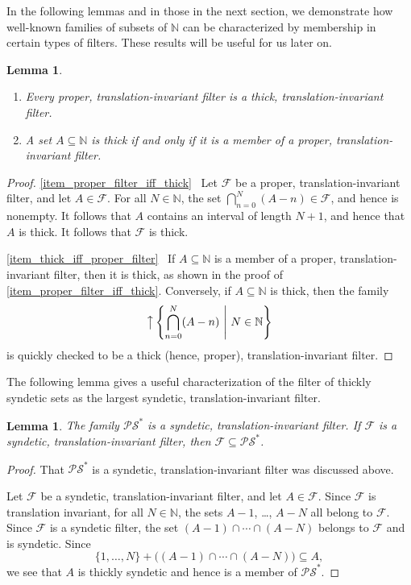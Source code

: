 \documentclass[letter,11pt]{article}
\theoremstyle{plain}
\newtheorem{lemma}[theorem]{Lemma}
\theoremstyle{definition}
\theoremstyle{plain}
\theoremstyle{plain}
\numberwithin{equation}{section}
\newcommand{\N}{\mathbb{N}}
\DeclareMathOperator{\bigupclose}{\big\uparrow}
\newcommand{\PS}{\mathcal{PS}}
\newcommand{\family}{\mathscr{F}}
\begin{document}
In the following lemmas and in those in the next section, we demonstrate how well-known families of subsets of $\N$ can be characterized by membership in certain types of filters.  These results will be useful for us later on.

\begin{lemma} \leavevmode
\label{lemma_thick_set_filter_char}
    \begin{enumerate}
        \item
        \label{item_proper_filter_iff_thick}
        Every proper, translation-invariant filter is a thick, translation-invariant filter.

        \item
        \label{item_thick_iff_proper_filter}
        A set $A \subseteq \N$ is thick if and only if it is a member of a proper, translation-invariant filter.
    \end{enumerate}
\end{lemma}

\begin{proof}
    \eqref{item_proper_filter_iff_thick} \ Let $\family$ be a proper, translation-invariant filter, and let $A \in \family$.  For all $N \in \N$, the set $\bigcap_{n=0}^N (A-n) \in \family$, and hence is nonempty.  It follows that $A$ contains an interval of length $N+1$, and hence that $A$ is thick.  It follows that $\family$ is thick.

    
    \eqref{item_thick_iff_proper_filter} \ If $A \subseteq \N$ is a member of a proper, translation-invariant filter, then it is thick, as shown in the proof of \eqref{item_proper_filter_iff_thick}.  Conversely, if $A \subseteq \N$ is thick, then the family
    \[\bigupclose \left \{ \bigcap_{n=0}^N (A-n) \ \middle| \ N \in \N \right\}\]
    is quickly checked to be a thick (hence, proper), translation-invariant filter.
\end{proof}

The following lemma gives a useful characterization of the filter of thickly syndetic sets as the largest syndetic, translation-invariant filter.

\begin{lemma}
\label{lemma_condition_on_subfamily_of_ps_star}
    The family $\PS^*$ is a syndetic, translation-invariant filter.  If $\family$ is a syndetic, translation-invariant filter, then $\family \subseteq \PS^*$.
\end{lemma}
\begin{proof}
    That $\PS^*$ is a syndetic, translation-invariant filter was discussed above.
    
    Let $\family$ be a syndetic, translation-invariant filter, and let $A \in \family$.  Since $\family$ is translation invariant, for all $N \in \N$, the sets $A-1$, \dots, $A-N$ all belong to $\family$. Since $\family$ is a syndetic filter, the set $(A - 1) \cap \cdots \cap (A - N)$ belongs to $\family$ and is syndetic.  Since
    \[\{1, \ldots, N\} + \big( (A - 1) \cap \cdots \cap (A - N) \big) \subseteq A,\]
    we see that $A$ is thickly syndetic and hence is a member of $\PS^*$.
\end{proof}
\end{document}
